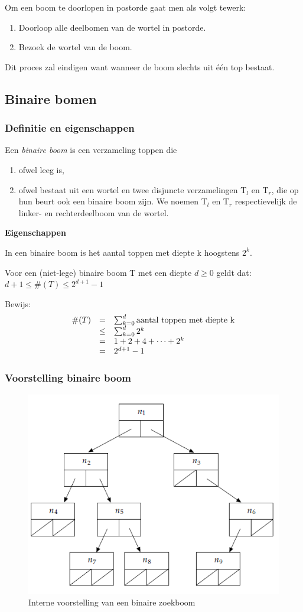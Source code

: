 \documentclass[a4paper,12pt]{article}
\begin{document}
Om een boom te doorlopen in postorde gaat men als volgt tewerk:
\begin{enumerate}
\item Doorloop alle deelbomen van de wortel in postorde.
\item Bezoek de wortel van de boom.
\end{enumerate}

Dit proces zal eindigen want wanneer de boom slechts uit één top bestaat.

\subsection{Binaire bomen}
\subsubsection{Definitie en eigenschappen}
Een \textit{binaire boom} is een verzameling toppen die
\begin{enumerate}
\item ofwel leeg is,
\item ofwel bestaat uit een wortel en twee disjuncte verzamelingen T$_l$ en T$_r$, die op hun beurt ook een binaire boom zijn.
We noemen T$_l$ en T$_r$ respectievelijk de linker- en rechterdeelboom van de wortel.
\end{enumerate}

\textbf{Eigenschappen}

In een binaire boom is het aantal toppen met diepte k hoogstens $2^k$.

Voor een (niet-lege) binaire boom T met een diepte $d\geq 0$ geldt dat:
$d+1\leq \#(T) \leq 2^{d+1}-1$

Bewijs:
\begin{equation}
\begin{array}{r c l}
\#(T) & = & \sum^d_{k=0}\text{aantal toppen met diepte k}\\
&\leq & \sum^d_{k=0}2^k\\
&=&1+2+4+\dots+2^k\\
&=&2^{d+1}-1\\
\end{array}
\end{equation}

\subsubsection{Voorstelling binaire boom}
\begin{figure}[H]
	\centering
	\includegraphics[width=.5\linewidth]{img/BinaireZoekboom}
  	\caption{Interne voorstelling van een binaire zoekboom}
  	\label{fig:InterneVoorstellingBinaireZoekboom}
\end{figure}
\end{document}

